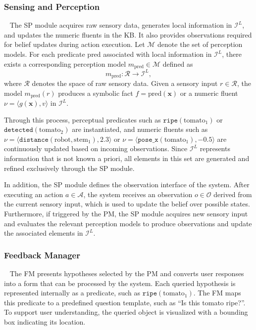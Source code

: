 \subsubsection{Sensing and Perception}~\label{method:SP}
The SP module acquires raw sensory data, generates local information in $\mathcal{I}^{L}$, and updates the numeric fluents in the KB. It also provides observations required for belief updates during action execution. Let $\mathcal{M}$ denote the set of perception models. For each predicate $\text{pred}$ associated with local information in $\mathcal{I}^{L}$, there exists a corresponding perception model $m_{\text{pred}} \in \mathcal{M}$ defined as
\[
m_{\text{pred}} : \mathcal{R} \rightarrow \mathcal{I}^{L},
\]
where $\mathcal{R}$ denotes the space of raw sensory data. Given a sensory input $r \in \mathcal{R}$, the model $m_{\text{pred}}(r)$ produces a symbolic fact $f = \text{pred}(\mathbf{x})$ or a numeric fluent $\nu = \langle g(\mathbf{x}), v \rangle$ in $\mathcal{I}^{L}$.

Through this process, perceptual predicates such as $\texttt{ripe}(\text{tomato}_1)$ or $\texttt{detected}(\text{tomato}_2)$ are instantiated, and numeric fluents such as $\nu = \langle \texttt{distance}(\text{robot}, \text{stem}_1), 2.3 \rangle$ or $\nu = \langle \texttt{pose\_x}(\text{tomato}_1), -0.5 \rangle$ are continuously updated based on incoming observations. Since $\mathcal{I}^{L}$ represents information that is not known a priori, all elements in this set are generated and refined exclusively through the SP module.

In addition, the SP module defines the observation interface of the system. After executing an action $a \in \mathcal{A}$, the system receives an observation $o \in \mathcal{O}$ derived from the current sensory input, which is used to update the belief over possible states. Furthermore, if triggered by the PM, the SP module acquires new sensory input and evaluates the relevant perception models to produce observations and update the associated elements in $\mathcal{I}^{L}$.



\subsubsection{Feedback Manager}~\label{method:FM}
The FM presents hypotheses selected by the PM and converts user responses into a form that can be processed by the system. Each queried hypothesis is represented internally as a predicate, such as $\texttt{ripe}(\text{tomato}_1)$. The FM maps this predicate to a predefined question template, such as ``Is this tomato ripe?''. To support user understanding, the queried object is visualized with a bounding box indicating its location.

